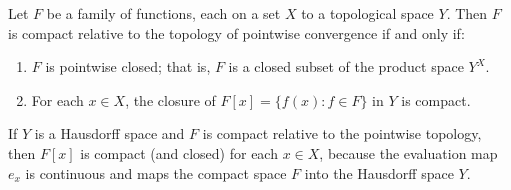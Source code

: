 Let $F$ be a family of functions, each on a set $X$ to a topological space $Y$. Then $F$ is compact relative to the topology of pointwise convergence if and only if:

\begin{enumerate}
  \item[(a)] $F$ is pointwise closed; that is, $F$ is a closed subset of the product space $Y^X$.
  \item[(b)] For each $x \in X$, the closure of $F[x] = \{f(x) : f \in F\}$ in $Y$ is compact.
\end{enumerate}

If $Y$ is a Hausdorff space and $F$ is compact relative to the pointwise topology, then $F[x]$ is compact (and closed) for each $x \in X$, because the evaluation map $e_x$ is continuous and maps the compact space $F$ into the Hausdorff space $Y$.
